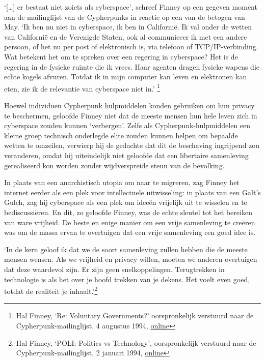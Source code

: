 \documentclass[smalldemyvopaper,11pt,twoside,onecolumn,openright,extrafontsizes,hidelinks]{memoir}
\begin{document}
`{[}\ldots{]} er bestaat niet zoiets als cyberspace', schreef Finney op
een gegeven moment aan de mailinglijst van de Cypherpunks in reactie op
een van de betogen van May. `Ik ben nu niet in cyberspace, ik ben in
Californië. Ik val onder de wetten van Californië en de Verenigde
Staten, ook al communiceer ik met een andere persoon, of het nu per post
of elektronisch is, via telefoon of TCP/IP-verbinding. Wat betekent het
om te spreken over een regering in cyberspace? Het is de regering in de
fysieke ruimte die ik vrees. Haar agenten dragen fysieke wapens die
echte kogels afvuren. Totdat ik in mijn computer kan leven en elektronen
kan eten, zie ik de relevantie van cyberspace niet in.' \footnote{Hal
  Finney, `Re: Voluntary Governments?' oorspronkelijk verstuurd naar de
  Cypherpunk-mailinglijst, 4 augustus 1994,
  \href{https://cypherpunks.venona.com/date/1994/08/msg00239.html}{online}}

Hoewel individuen Cypherpunk hulpmiddelen konden gebruiken om hun
privacy te beschermen, geloofde Finney niet dat de meeste mensen hun
hele leven zich in cyberspace zouden kunnen `verbergen'. Zelfs als
Cypherpunk-hulpmiddelen een kleine groep technisch onderlegde elite
zouden kunnen helpen om bepaalde wetten te omzeilen, verwierp hij de
gedachte dat dit de beschaving ingrijpend zou veranderen, omdat hij
uiteindelijk niet geloofde dat een libertaire samenleving gerealiseerd
kon worden zonder wijdverspreide steun van de bevolking.

In plaats van een anarchistisch utopia om naar te migreren, zag Finney
het internet eerder als een plek voor intellectuele uitwisseling: in
plaats van een Galt's Gulch, zag hij cyberspace als een plek om ideeën
vrijelijk uit te wisselen en te bediscussiëren. En dit, zo geloofde
Finney, was de echte sleutel tot het bereiken van ware vrijheid. De
beste en enige manier om een vrije samenleving te creëren was om de
massa ervan te overtuigen dat een vrije samenleving een goed idee is.

`In de kern geloof ik dat we de soort samenleving zullen hebben die de
meeste mensen wensen. Als we vrijheid en privacy willen, moeten we
anderen overtuigen dat deze waardevol zijn. Er zijn geen
snelkoppelingen. Terugtrekken in technologie is als het over je hoofd
trekken van je dekens. Het voelt even goed, totdat de realiteit je
inhaalt.'\footnote{Hal Finney, `POLI: Politics vs Technology',
  oorspronkelijk verstuurd naar de Cypherpunk-mailinglijst, 2 januari
  1994,
  \href{https://cypherpunks.venona.com/date/1994/01/msg00014.html}{online}}
\end{document}
